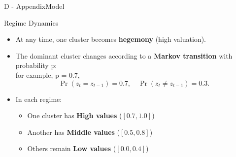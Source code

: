 \documentclass{beamer}
\begin{document}
\begin{frame}{D - Appendix{Model}}
    \begin{block}{Regime Dynamics}
    \begin{itemize}
        \item At any time, one cluster becomes \textbf{hegemony} (high valuation).
        \item The dominant cluster changes according to a \textbf{Markov transition} with probability p:\\
        for example, p = 0.7, 
              \[
              \Pr(z_t = z_{t-1}) = 0.7, \quad 
              \Pr(z_t \neq z_{t-1}) = 0.3.
              \]
        \item In each regime:
              \begin{itemize}
                  \item One cluster has \textbf{High values} ($[0.7, 1.0]$)
                  \item Another has \textbf{Middle values} ($[0.5, 0.8]$)
                  \item Others remain \textbf{Low values} ($[0.0, 0.4]$)
              \end{itemize}
    \end{itemize}
    \end{block}
\end{frame}
\end{document}
